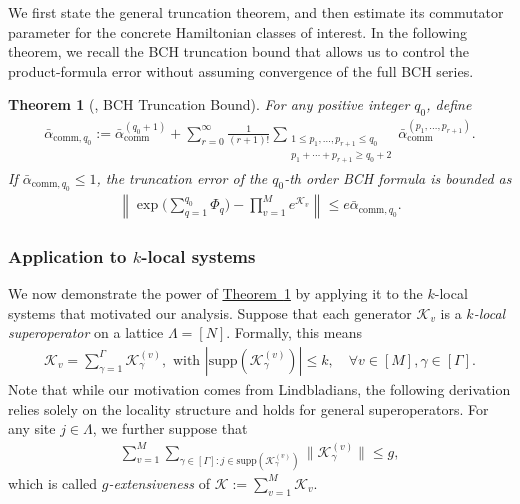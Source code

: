 \documentclass[11pt]{article}
\newtheorem{theorem}{Theorem}
\newcommand{\thm}[1]{\hyperref[thm:#1]{Theorem~\ref*{thm:#1}}}
\renewcommand{\comm}{\mathrm{comm}}
\newcommand{\supp}{\mathrm{supp}}
\newcommand{\mc}{\mathcal}
\newcommand{\sz}[1]{{\color{blue} Shuo: #1}}
\begin{document}
We first state the general truncation theorem, and then estimate its commutator parameter for the concrete Hamiltonian classes of interest.
In the following theorem, we recall the BCH truncation bound that allows us to control the product-formula error without assuming convergence of the full BCH series.
\begin{theorem}[{\cite[Theorem~6]{wang2026lindbladiansimulationcommutatorbounds}}, BCH Truncation Bound]
 \label{thm:general-bch-truncation}
 For any positive integer $q_0$, define 
 \begin{align}
\label{eq:def-beta-comm-sum}
    \bar{\alpha}_{\comm,q_0} := \bar{\alpha}_{\comm}^{(q_0+1)} + \sum_{r = 0}^{\infty}\frac{1}{(r+1)!} \sum_{\substack{1\le p_1, \ldots, p_{r+1}\le q_0\\p_1+\cdots+p_{r+1} \ge q_0+2}}\bar{\alpha}_{\comm}^{(p_1, \ldots, p_{r+1})}.
\end{align}
 If $\bar{\alpha}_{\comm,q_0} \le 1$, the truncation error of the $q_0$-th order BCH formula is bounded as
 \begin{align*}
 \left\|\exp\Big(\sum_{q=1}^{q_0} \Phi_q\Big) - \prod_{v = 1}^Me^{\mc K_v} \right\| \le e\bar{\alpha}_{\comm,q_0}.
 \end{align*}
\end{theorem}


\subsubsection{Application to $k$-local systems}
\label{sec:k-local-example}

We now demonstrate the power of \thm{general-bch-truncation} by applying it to the $k$-local systems that motivated our analysis. Suppose that each generator $\mc K_v$ is a \emph{$k$-local superoperator} on a lattice $\Lambda = [N]$. Formally, this means
\begin{align*}
    \mc K_v = \sum_{\gamma = 1}^{\Gamma} \mc K_{\gamma}^{(v)}, \text{ with } |\supp(\mc K_{\gamma}^{(v)} )|\le k, \quad \forall v\in [M], \gamma\in [\Gamma].
\end{align*} 
Note that while our motivation comes from Lindbladians, the following derivation relies solely on the locality structure and holds for general superoperators.
For any site $j\in \Lambda$, we further suppose that 
\begin{align*}
    \sum_{v=1}^M\sum_{\gamma\in [\Gamma]: j\in \supp(\mc K_{\gamma}^{(v)})}\|\mc K_\gamma^{(v)}\|\le g,
\end{align*}
which is called \emph{$g$-extensiveness} of $\mc K:= \sum_{v=1}^M \mc K_v$.
\end{document}

